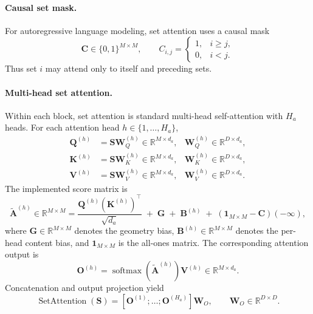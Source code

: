 \documentclass{article}
\theoremstyle{plain}
\theoremstyle{definition}
\theoremstyle{remark}
\begin{document}
\paragraph{Causal set mask.}
For autoregressive language modeling, set attention uses a causal mask
\begin{equation}
\label{eq:causal-mask}
\mathbf C\in\{0,1\}^{M\times M},
\qquad
C_{i,j}=
\begin{cases}
1,& i\ge j,\\
0,& i<j.
\end{cases}
\end{equation}
Thus set $i$ may attend only to itself and preceding sets.

\paragraph{Multi-head set attention.}
Within each block, set attention is standard multi-head self-attention with $H_a$ heads. For each attention head $h\in\{1,\dots,H_a\}$,
\begin{align}
\label{eq:qkv-projections}
\mathbf Q^{(h)} &= \mathbf S\mathbf W_Q^{(h)} \in \mathbb R^{M\times d_a},
&\mathbf W_Q^{(h)}\in\mathbb R^{D\times d_a},\\
\mathbf K^{(h)} &= \mathbf S\mathbf W_K^{(h)} \in \mathbb R^{M\times d_a},
&\mathbf W_K^{(h)}\in\mathbb R^{D\times d_a},\\
\mathbf V^{(h)} &= \mathbf S\mathbf W_V^{(h)} \in \mathbb R^{M\times d_a},
&\mathbf W_V^{(h)}\in\mathbb R^{D\times d_a}.
\end{align}
The implemented score matrix is
\begin{equation}
\label{eq:attention-scores}
\widetilde{\mathbf A}^{(h)} \in \mathbb R^{M\times M}
=
\frac{\mathbf Q^{(h)}(\mathbf K^{(h)})^\top}{\sqrt{d_a}}
\;+\;\mathbf G
\;+\;\mathbf B^{(h)}
\;+\;(\mathbf 1_{M\times M}-\mathbf C)(-\infty),
\end{equation}
where $\mathbf G\in\mathbb R^{M\times M}$ denotes the geometry bias, $\mathbf
B^{(h)}\in\mathbb R^{M\times M}$ denotes the per-head content bias, and
$\mathbf 1_{M\times M}$ is the all-ones matrix. The corresponding attention
output is
\begin{equation}
\label{eq:attention-output}
\mathbf O^{(h)}=\operatorname{softmax}(\widetilde{\mathbf A}^{(h)})\mathbf V^{(h)}
\in \mathbb R^{M\times d_a}.
\end{equation}
Concatenation and output projection yield
\begin{equation}
\label{eq:multihead-concat}
\operatorname{SetAttention}(\mathbf S)
=
[\mathbf O^{(1)};\dots;\mathbf O^{(H_a)}]\mathbf W_O,
\qquad
\mathbf W_O\in\mathbb R^{D\times D}.
\end{equation}
\end{document}

